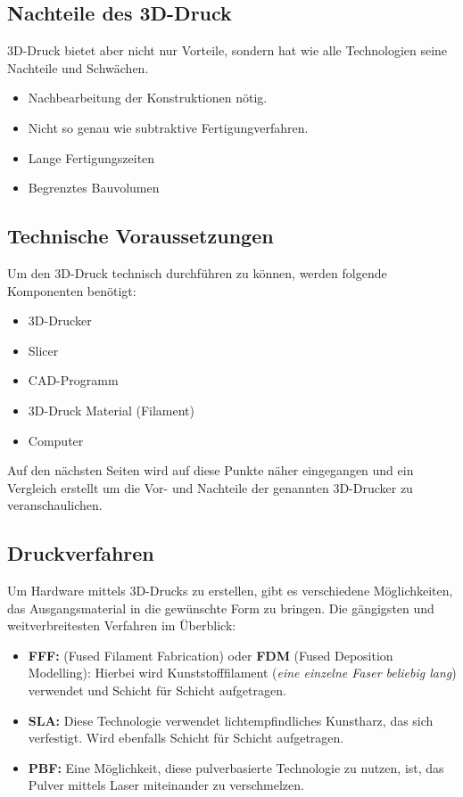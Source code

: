 \subsection{Nachteile des 3D-Druck}
3D-Druck bietet aber nicht nur Vorteile, sondern hat wie alle Technologien seine Nachteile und Schwächen.
\begin{itemize}
	\item Nachbearbeitung der Konstruktionen nötig.
	\item Nicht so genau wie subtraktive Fertigungverfahren.
	\item Lange Fertigungszeiten
	\item Begrenztes Bauvolumen
\end{itemize}
\parencite{3DDruckNachteile}

\subsection{Technische Voraussetzungen}
Um den 3D-Druck technisch durchführen zu können, werden folgende Komponenten benötigt:
\begin{itemize} 
	\item 3D-Drucker
	\item Slicer
	\item CAD-Programm
	\item 3D-Druck Material (Filament)
	\item Computer
\end{itemize}
Auf den nächsten Seiten wird auf diese Punkte näher eingegangen und ein Vergleich erstellt um die Vor- und Nachteile \parencite{3ds} der genannten 3D-Drucker zu veranschaulichen. 


\subsection{Druckverfahren}

Um Hardware mittels 3D-Drucks zu erstellen, gibt es verschiedene Möglichkeiten, das Ausgangsmaterial \parencite{3ds} in die gewünschte Form zu bringen. Die gängigsten und weitverbreitesten Verfahren \parencite{kaffka} im Überblick: 

\begin{itemize}
	\item \textbf{FFF:} (Fused Filament Fabrication) oder \textbf{FDM} (Fused Deposition Modelling): Hierbei wird Kunststofffilament (\textit{eine einzelne Faser beliebig lang}) verwendet und Schicht für Schicht aufgetragen.
	\item \textbf{SLA:} Diese Technologie verwendet lichtempfindliches Kunstharz, das sich verfestigt. Wird ebenfalls Schicht für Schicht aufgetragen.
	\item \textbf{PBF:} Eine Möglichkeit, diese pulverbasierte Technologie zu nutzen, ist, das Pulver mittels Laser miteinander zu verschmelzen.  
\end{itemize}


